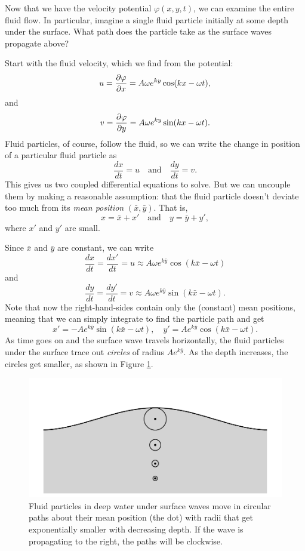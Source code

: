 \begin{example}

Now that we have the velocity potential $\varphi(x, y, t)$, we can examine the entire fluid flow.  In particular, imagine a single fluid particle initially at some depth under the surface.  What path does the particle take as the surface waves propagate above?

Start with the fluid velocity, which we find from the potential:
\[
u = \frac{\partial {\varphi}}{\partial {x}} = A \omega e^{ky} \cos (kx - \omega t),
\]
and
\[
v = \frac{\partial {\varphi}}{\partial {y}} = A \omega e^{ky} \sin (kx - \omega t).
\]
Fluid particles, of course, follow the fluid, so we can write the change in position of a particular fluid particle as
\[
\frac{dx}{dt} = u \quad \text{and} \quad \frac{dy}{dt} = v.
\]
This gives us two coupled differential equations to solve.  But we can uncouple them by making a reasonable assumption:  that the fluid particle doesn't deviate too much from its \emph{mean position} $(\bar{x}, \bar{y})$.  That is, 
\[
x = \bar{x} + x'  \quad \text{and} \quad y = \bar{y} + y',
\]
where $x'$ and $y'$ are small.

Since $\bar{x}$ and $\bar{y}$ are constant, we can write
\[
\frac{dx}{dt} = \frac{dx'}{dt} = u \approx A \omega e^{k\bar{y}} \cos (k \bar{x} - \omega t)
\]
and 
\[
\frac{dy}{dt} = \frac{dy'}{dt} = v \approx A \omega e^{k\bar{y}} \sin (k \bar{x} - \omega t).
\]
Note that now the right-hand-sides contain only the (constant) mean positions, meaning that we can simply integrate to find the particle path and get
\begin{equation}
x' = -A e^{k\bar{y}} \sin(k\bar{x} - \omega t), \quad  y' = A e^{k\bar{y}} \cos (k\bar{x} - \omega t).
\end{equation}
As time goes on and the surface wave travels horizontally, the fluid particles under the surface trace out \emph{circles} of radius $Ae^{k\bar{y}}$.  As the depth increases, the circles get smaller, as shown in Figure \ref{fig_circle_paths}.

\end{example}


\begin{figure}
\centering\includegraphics[width=0.8\linewidth]{Figures/Chapter5/fig_circle_paths}
\caption{Fluid particles in deep water under surface waves move in circular paths about their mean position (the dot) with radii that get exponentially smaller with decreasing depth.  If the wave is propagating to the right, the paths will be clockwise.}
\label{fig_circle_paths}
\end{figure}

